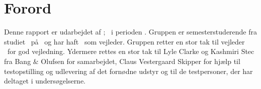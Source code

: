 \chapter*{Forord}
\label{Forord}
Denne rapport er udarbejdet af \groupname; \groupmembers\ i perioden \projectperiod. Gruppen er \semester semesterstuderende fra studiet \studyname\ på \universityname\ og har haft \supervisor\ som vejleder. Gruppen retter en stor tak til vejleder \supervisor\ for god vejledning. Ydermere rettes en stor tak til Lyle Clarke og Kashmiri Stec fra Bang $\&$ Olufsen for samarbejdet, Claus Vestergaard Skipper for hjælp til testopstilling og udlevering af det fornødne udstyr og til de testpersoner, der har deltaget i undersøgelserne.    

%
